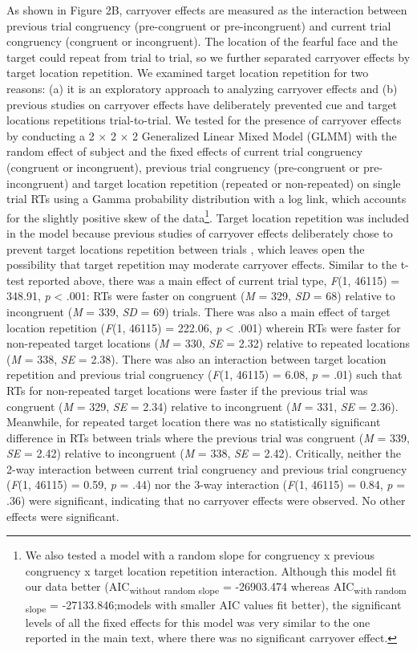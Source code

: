 \documentclass{article}
\begin{document}
As shown in Figure 2B, carryover effects are measured as the interaction between previous trial congruency (pre-congruent or pre-incongruent) and current trial congruency (congruent or incongruent). The location of the fearful face and the target could repeat from trial to trial, so we further separated carryover effects by target location repetition. We examined target location repetition for two reasons: (a) it is an exploratory approach to analyzing carryover effects and (b) previous studies on carryover effects \parencite{Gladwin2019a} have deliberately prevented cue and target locations repetitions trial-to-trial. We tested for the presence of carryover effects by conducting a 2 × 2 × 2 Generalized Linear Mixed Model (GLMM) with the random effect of subject and the fixed effects of current trial congruency (congruent or incongruent), previous trial congruency (pre-congruent or pre-incongruent) and target location repetition (repeated or non-repeated) on single trial RTs using a Gamma probability distribution with a log link, which accounts for the slightly positive skew of the data\footnote{We also tested a model with a random slope for congruency x previous congruency x target location repetition interaction. Although this model fit our data better (AIC\textsubscript{without random slope} = -26903.474 whereas AIC\textsubscript{with random slope} = -27133.846;models with smaller AIC values fit better), the significant levels of all the fixed effects for this model was very similar to the one reported in the main text, where there was no significant carryover effect.}. Target location repetition was included in the model because previous studies of carryover effects deliberately chose to prevent target locations repetition between trials \parencite{Gladwin2019a}, which leaves open the possibility that target repetition may moderate carryover effects. Similar to the t-test reported above, there was a main effect of current trial type, \emph{F}(1, 46115) = 348.91, \emph{p }< .001: RTs were faster on congruent (\emph{M }= 329, \emph{SD}\emph{ }= 68) relative to incongruent (\emph{M }= 339, \emph{SD }= 69) trials. There was also a main effect of target location repetition (\emph{F}(1, 46115) = 222.06, \emph{p }< .001) wherein RTs were faster for non-repeated target locations (\emph{M }= 330, \emph{SE }= 2.32) relative to repeated locations (\emph{M }= 338, \emph{SE }= 2.38). There was also an interaction between target location repetition and previous trial congruency (\emph{F}(1, 46115) = 6.08, \emph{p }= .01) such that RTs for non-repeated target locations were faster if the previous trial was congruent (\emph{M }= 329, \emph{SE }= 2.34) relative to incongruent (\emph{M }= 331, \emph{SE }= 2.36). Meanwhile, for repeated target location there was no statistically significant difference in RTs between trials where the previous trial was congruent (\emph{M }= 339, \emph{SE }= 2.42) relative to incongruent (\emph{M }= 338, \emph{SE }= 2.42). Critically, neither the 2-way interaction between current trial congruency and previous trial congruency (\emph{F}(1, 46115) = 0.59, \emph{p }= .44) nor the 3-way interaction (\emph{F}(1, 46115) = 0.84, \emph{p }= .36) were significant, indicating that no carryover effects were observed. No other effects were significant.
\end{document}
